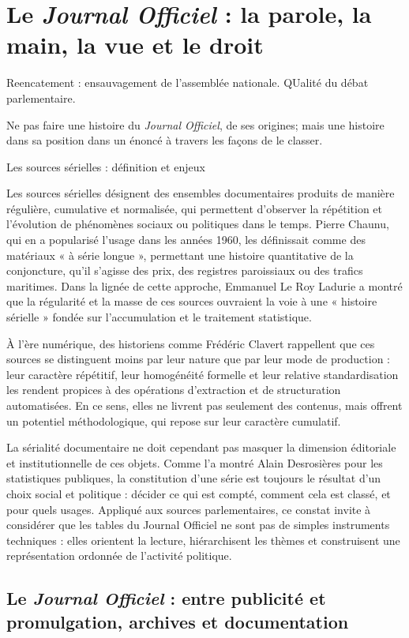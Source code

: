 \chapter{Le \emph{Journal Officiel} : la parole, la main, la vue et le droit}

Reencatement : ensauvagement de l'assemblée nationale. QUalité du débat parlementaire.

Ne pas faire une histoire du \emph{Journal Officiel}, de ses origines; mais une histoire dans sa position dans un énoncé à travers les façons de le classer.

 Les sources sérielles : définition et enjeux

Les sources sérielles désignent des ensembles documentaires produits de manière régulière, cumulative et normalisée, qui permettent d’observer la répétition et l’évolution de phénomènes sociaux ou politiques dans le temps. Pierre Chaunu, qui en a popularisé l’usage dans les années 1960, les définissait comme des matériaux « à série longue », permettant une histoire quantitative de la conjoncture, qu’il s’agisse des prix, des registres paroissiaux ou des trafics maritimes. Dans la lignée de cette approche, Emmanuel Le Roy Ladurie a montré que la régularité et la masse de ces sources ouvraient la voie à une « histoire sérielle » fondée sur l’accumulation et le traitement statistique.

À l’ère numérique, des historiens comme Frédéric Clavert rappellent que ces sources se distinguent moins par leur nature que par leur mode de production : leur caractère répétitif, leur homogénéité formelle et leur relative standardisation les rendent propices à des opérations d’extraction et de structuration automatisées. En ce sens, elles ne livrent pas seulement des contenus, mais offrent un potentiel méthodologique, qui repose sur leur caractère cumulatif.

La sérialité documentaire ne doit cependant pas masquer la dimension éditoriale et institutionnelle de ces objets. Comme l’a montré Alain Desrosières pour les statistiques publiques, la constitution d’une série est toujours le résultat d’un choix social et politique : décider ce qui est compté, comment cela est classé, et pour quels usages. Appliqué aux sources parlementaires, ce constat invite à considérer que les tables du Journal Officiel ne sont pas de simples instruments techniques : elles orientent la lecture, hiérarchisent les thèmes et construisent une représentation ordonnée de l’activité politique.

\section{Le \emph{Journal Officiel} : entre publicité et promulgation, archives et documentation}

